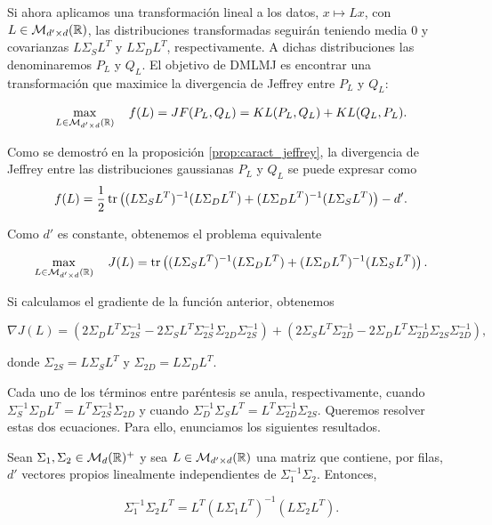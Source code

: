 Si ahora aplicamos una transformación lineal a los datos, $x \mapsto Lx$, con $L \in \mathcal{M}_{d'\times d}(\mathbb{R})$, las distribuciones transformadas seguirán teniendo media 0 y covarianzas $L\Sigma_S L^T$ y $L\Sigma_D L^T$, respectivamente. A dichas distribuciones las denominaremos $P_L$ y $Q_L$. El objetivo de DMLMJ es encontrar una transformación que maximice la divergencia de Jeffrey entre $P_L$ y $Q_L$:

\[ \max_{L \in \mathcal{M}_{d'\times d}(\mathbb{R})} \quad f(L) =  JF(P_L,Q_L) = KL(P_L,Q_L) + KL(Q_L,P_L).\]

Como se demostró en la proposición \ref{prop:caract_jeffrey}, la divergencia de Jeffrey entre las distribuciones gaussianas $P_L$ y $Q_L$ se puede expresar como 
\[ f(L) = \frac{1}{2} \operatorname{tr}\left( (L\Sigma_S L^T)^{-1} (L\Sigma_D L^T) + (L \Sigma_D L^T)^{-1} (L \Sigma_S L^T) \right) - d'. \]

Como $d'$ es constante, obtenemos el problema equivalente

\[ \max_{L \in \mathcal{M}_{d'\times d}(\mathbb{R})} \quad J(L) =  \operatorname{tr}\left( (L\Sigma_S L^T)^{-1} (L\Sigma_D L^T) + (L \Sigma_D L^T)^{-1} (L \Sigma_S L^T) \right).\]

Si calculamos el gradiente de la función anterior, obtenemos

\[ \nabla J(L) = \left( 2 \Sigma_D L^T\Sigma_{2S}^{-1} - 2\Sigma_S L^T \Sigma_{2S}^{-1}\Sigma_{2D}\Sigma_{2S}^{-1} \right) + \left( 2\Sigma_S L^T \Sigma_{2D}^{-1} - 2 \Sigma_D L^T \Sigma_{2D}^{-1}\Sigma_{2S} \Sigma_{2D}^{-1} \right),\]

donde $\Sigma_{2S} = L \Sigma_S L^T$ y $\Sigma_{2D} = L\Sigma_D L^T$.

Cada uno de los términos entre paréntesis se anula, respectivamente, cuando $\Sigma_S^{-1} \Sigma_D L^T = L^T \Sigma_{2S}^{-1} \Sigma_{2D}$ y cuando $\Sigma_{D}^{-1}\Sigma_S L^T = L^T \Sigma_{2D}^{-1} \Sigma_{2S}$. Queremos resolver estas dos ecuaciones. Para ello, enunciamos los siguientes resultados.

\begin{thm}

    Sean $\Sigma_1, \Sigma_2 \in \mathcal{M}_d(\mathbb{R})^+$ y sea $L \in \mathcal{M}_{d'\times d}(\mathbb{R})$ una matriz que contiene, por filas, $d'$ vectores propios linealmente independientes de $\Sigma_1^{-1}\Sigma_2$. Entonces,

    \begin{equation} \label{eq:jef:thm1}
        \Sigma_1^{-1}\Sigma_2L^T = L^T(L\Sigma_1L^T)^{-1}(L\Sigma_2L^T).
    \end{equation}
\end{thm}

